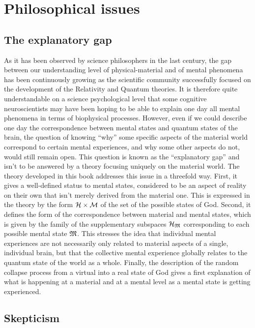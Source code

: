 \chapter{Philosophical issues}
\label{Philosophical issues}

\section{The explanatory gap}

As it has been observed by science philosophers in the last century, the gap between our understanding level of physical-material and of mental phenomena has been continuously growing as the scientific community successfully focused on the development of the Relativity and Quantum theories. It is therefore quite understandable on a science psychological level that some cognitive neuroscientists may have been hoping to be able to explain one day all mental phenomena in terms of biophysical processes. However, even if we could describe one day the correspondence between mental states and quantum states of the brain, the question of knowing ``why'' some specific aspects of the material world correspond to certain mental experiences, and why some other aspects do not, would still remain open. This question is known as the ``explanatory gap'' and isn't to be answered by a theory focusing uniquely on the material world. The theory developed in this book addresses this issue in a threefold way. First, it gives a well-defined status to mental states, considered to be an aspect of reality on their own that isn't merely derived from the material one. This is expressed in the theory by the form  $\mathcal H \times \mathcal M$ of the set of the possible states of God. Second, it defines the form of the correspondence between material and mental states, which is given by the family of the supplementary subspaces $\mathcal H_{\mathfrak{M}}$ corresponding to each possible mental state $\mathfrak{M}$. This stresses the idea that individual mental experiences are not necessarily only related to material aspects of a single, individual brain, but that the collective mental experience globally relates to the quantum state of the world as a whole. Finally, the description of the random collapse process from a virtual into a real state of God gives a first explanation of what is happening at a material and at a mental level as a mental state is getting experienced.

\section{Skepticism}

